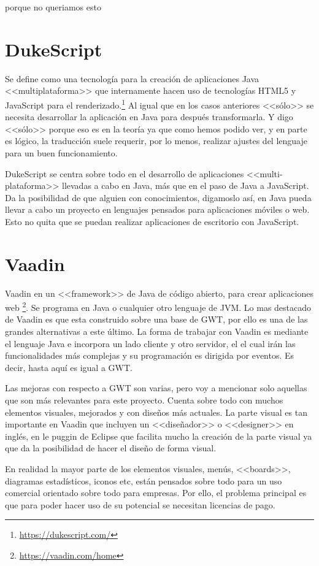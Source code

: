 porque no queriamos esto

\section{DukeScript}

Se define como una tecnología para la creación de aplicaciones Java <<multiplataforma>> que internamente hacen uso de tecnologías HTML5 y JavaScript para el renderizado.\footnote{\url{https://dukescript.com/}}
Al igual que en los casos anteriores <<sólo>> se necesita desarrollar la aplicación en Java para después transformarla. Y digo <<sólo>> porque eso es en la teoría ya que como hemos podido ver, y en parte es lógico, la traducción suele requerir, por lo menos, realizar ajustes del lenguaje para un buen funcionamiento.

DukeScript se centra sobre todo en el desarrollo de aplicaciones <<multi-plataforma>> llevadas a cabo en Java, más que en el paso de Java a JavaScript. Da la posibilidad de que alguien con conocimientos, digamoslo así, en Java pueda llevar a cabo un proyecto en lenguajes pensados para aplicaciones móviles o web. Esto no quita que se puedan realizar aplicaciones de escritorio con JavaScript.

\section{Vaadin}

Vaadin en un <<framework>> de Java de código abierto, para crear aplicaciones web \footnote{\url{https://vaadin.com/home}}. Se programa en Java o cualquier otro lenguaje de JVM. Lo mas destacado de Vaadin es que esta construido sobre una base de GWT, por ello es una de las grandes alternativas a este último. La forma de trabajar con Vaadin es mediante el lenguaje Java e incorpora un lado cliente y otro servidor, el el cual irán las funcionalidades más complejas y su programación es dirigida por eventos. Es decir, hasta aquí es igual a GWT.

Las mejoras con respecto a GWT son varias, pero voy a mencionar solo aquellas que son más relevantes para este proyecto. Cuenta sobre todo con muchos elementos visuales, mejorados y con diseños más actuales. La parte visual es tan importante en Vaadin que incluyen un <<diseñador>> o <<designer>> en inglés, en le puggin de Eclipse que facilita mucho la creación de la parte visual ya que da la posibilidad de hacer el diseño de forma visual.

En realidad la mayor parte de los elementos visuales, menús, <<boards>>, diagramas estadísticos, iconos etc, están pensados sobre todo para un uso comercial orientado sobre todo para empresas. Por ello, el problema principal es que para poder hacer uso de su potencial se necesitan licencias de pago.

